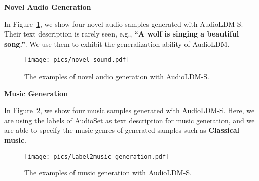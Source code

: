 \textbf{Novel Audio Generation}

In Figure~\ref{fig:novel-audio}, we show four novel audio samples generated with AudioLDM-S. Their text description is rarely seen, e.g., \textbf{``A wolf is singing a beautiful song.''}. We use them to exhibit the generalization ability of AudioLDM.
\vspace{0.3cm}

\begin{figure}[H]
    \centering
    \texttt{[image: pics/novel\_sound.pdf]}
    \caption{The examples of novel audio generation with AudioLDM-S.}
    \label{fig:novel-audio}
\end{figure}

\newpage

\textbf{Music Generation}

In Figure~\ref{fig:demo-audioset-music}, we show four music samples generated with AudioLDM-S. Here, we are using the labels of AudioSet as text description for music generation, and we are able to specify the music genres of generated samples such as \textbf{Classical music}.

\begin{figure}[H]
    \centering
    \texttt{[image: pics/label2music\_generation.pdf]}
    \caption{The examples of music generation with AudioLDM-S.}
    \label{fig:demo-audioset-music}
\end{figure}

\newpage

